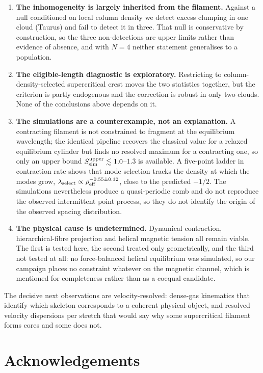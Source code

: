 \documentclass[usenatbib,twoside,twocolumn]{mnras}
\begin{document}
\begin{enumerate}
\item \textbf{The inhomogeneity is largely inherited from the filament.} Against a null conditioned on local column density we detect excess clumping in one cloud (Taurus) and fail to detect it in three. That null is conservative by construction, so the three non-detections are upper limits rather than evidence of absence, and with $N=4$ neither statement generalises to a population.
\item \textbf{The eligible-length diagnostic is exploratory.} Restricting to column-density-selected supercritical crest moves the two statistics together, but the criterion is partly endogenous and the correction is robust in only two clouds. None of the conclusions above depends on it.
\item \textbf{The simulations are a counterexample, not an explanation.} A contracting filament is not constrained to fragment at the equilibrium wavelength; the identical pipeline recovers the classical value for a relaxed equilibrium cylinder but finds no resolved maximum for a contracting one, so only an upper bound $S_{\rm sim}^{\rm upper}\lesssim1.0$--$1.3$ is available. A five-point ladder in contraction rate shows that mode selection tracks the density at which the modes grow, $\lambda_{\rm select}\propto\rho_{\rm eff}^{-0.55\pm0.12}$, close to the predicted $-1/2$. The simulations nevertheless produce a quasi-periodic comb and do not reproduce the observed intermittent point process, so they do not identify the origin of the observed spacing distribution.
\item \textbf{The physical cause is undetermined.} Dynamical contraction, hierarchical-fibre projection and helical magnetic tension all remain viable. The first is tested here, the second treated only geometrically, and the third not tested at all: no force-balanced helical equilibrium was simulated, so our campaign places no constraint whatever on the magnetic channel, which is mentioned for completeness rather than as a coequal candidate.
\end{enumerate}

The decisive next observations are velocity-resolved: dense-gas kinematics that identify which skeleton corresponds to a coherent physical object, and resolved velocity dispersions per stretch that would say why some supercritical filament forms cores and some does not.

\section*{Acknowledgements}
\end{document}
